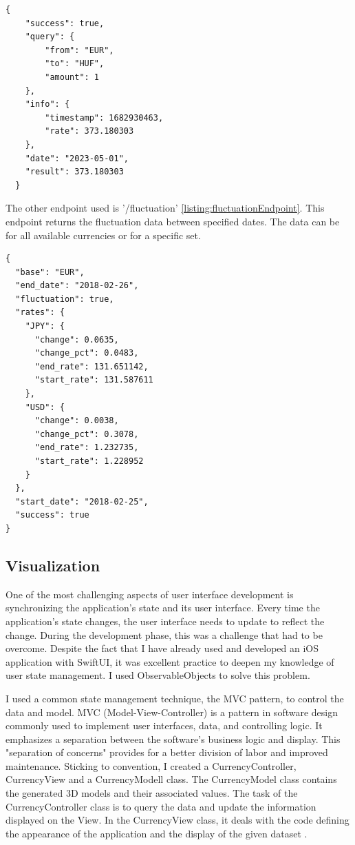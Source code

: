 \documentclass[a4paper,oneside]{article}
\begin{document}
\begin{lstlisting}[frame=single,float=!ht,caption=JSON from /convert endpoint, label=listing:convertEndpoint]
  {
    "success": true,
    "query": {
        "from": "EUR",
        "to": "HUF",
        "amount": 1
    },
    "info": {
        "timestamp": 1682930463,
        "rate": 373.180303
    },
    "date": "2023-05-01",
    "result": 373.180303
  }
\end{lstlisting}

The other endpoint used is '/fluctuation' \ref{listing:fluctuationEndpoint}. This endpoint returns the fluctuation data between specified dates. The data can be for all available currencies or for a specific set.


\begin{lstlisting}[frame=single,float=!ht,caption=JSON from /fluctuation endpoint, label=listing:fluctuationEndpoint]
{
  "base": "EUR",
  "end_date": "2018-02-26",
  "fluctuation": true,
  "rates": {
    "JPY": {
      "change": 0.0635,
      "change_pct": 0.0483,
      "end_rate": 131.651142,
      "start_rate": 131.587611
    },
    "USD": {
      "change": 0.0038,
      "change_pct": 0.3078,
      "end_rate": 1.232735,
      "start_rate": 1.228952
    }
  },
  "start_date": "2018-02-25",
  "success": true
}
\end{lstlisting}

\newpage
\subsection{Visualization}


One of the most challenging aspects of user interface development is synchronizing the application's state and its user interface. Every time the application's state changes, the user interface needs to update to reflect the change. During the development phase, this was a challenge that had to be overcome. Despite the fact that I have already used and developed an iOS application with SwiftUI, it was excellent practice to deepen my knowledge of user state management. I used ObservableObjects to solve this problem.

I used a common state management technique, the MVC pattern, to control the data and model. MVC (Model-View-Controller) is a pattern in software design commonly used to implement user interfaces, data, and controlling logic. It emphasizes a separation between the software's business logic and display. This "separation of concerns" provides for a better division of labor and improved maintenance.  Sticking to convention, I created a CurrencyController, CurrencyView and a CurrencyModell class. The CurrencyModel class contains the generated 3D models and their associated values. The task of the CurrencyController class is to query the data and update the information displayed on the View. In the CurrencyView class, it deals with the code defining the appearance of the application and the display of the given dataset \cite{mozilla}.
\end{document}
